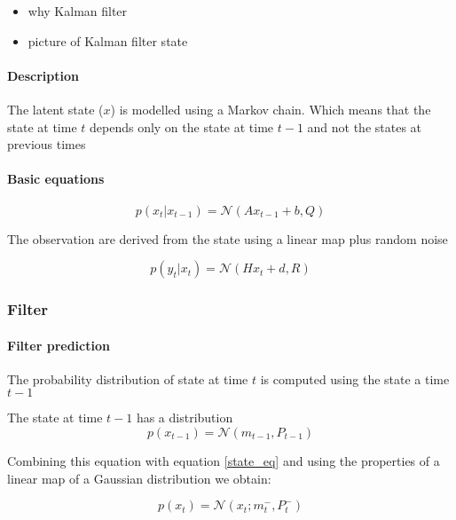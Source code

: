 \documentclass{article}
\begin{document}
\begin{itemize}
    \item why Kalman filter
    \item picture of Kalman filter state
\end{itemize}

\paragraph{Description}

The latent state ($x$) is modelled using a Markov chain. Which means that the state at time $t$ depends only on the state at time $t-1$ and not the states at previous times

\paragraph{Basic equations}

\begin{equation}\label{state_eq}
p(x_t | x_{t-1}) = \mathcal{N}(Ax_{t-1} + b, Q)
\end{equation}

The observation are derived from the state using a linear map plus random noise

\begin{equation}\label{obs_from_state}
    p(y_t | x_t) = \mathcal{N}(Hx_t + d, R)
\end{equation}

\subsubsection{Filter}

\paragraph{Filter prediction}

The probability distribution of state at time $t$ is computed using the state a time $t-1$

The state at time $t-1$ has a distribution $$ p(x_{t-1}) = \mathcal{N}(m_{t-1}, P_{t-1}) $$ 

Combining this equation with equation \ref{state_eq} and using the properties of a linear map of a Gaussian distribution we obtain:

\begin{equation}
    \label{filter_predict}p(x_t) = \mathcal{N}(x_t; m_t^-, P_t^-)
\end{equation} 
\end{document}
